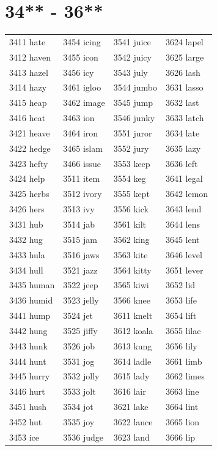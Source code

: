 \documentclass[12pt, oneside]{book}
\begin{document}
	\begin{table}[h]
		\centering
		\section*{34** - 36**}
		\begin{tabular}{l l l l}
			3411 hate & 3454 icing & 3541 juice & 3624 lapel\\
			3412 haven & 3455 icon & 3542 juicy & 3625 large\\
			3413 hazel & 3456 icy & 3543 july & 3626 lash\\
			3414 hazy & 3461 igloo & 3544 jumbo & 3631 lasso\\
			3415 heap & 3462 image & 3545 jump & 3632 last\\
			3416 heat & 3463 ion & 3546 junky & 3633 latch\\
			3421 heave & 3464 iron & 3551 juror & 3634 late\\
			3422 hedge & 3465 islam & 3552 jury & 3635 lazy\\
			3423 hefty & 3466 issue & 3553 keep & 3636 left\\
			3424 help & 3511 item & 3554 keg & 3641 legal\\
			3425 herbs & 3512 ivory & 3555 kept & 3642 lemon\\
			3426 hers & 3513 ivy & 3556 kick & 3643 lend\\
			3431 hub & 3514 jab & 3561 kilt & 3644 lens\\
			3432 hug & 3515 jam & 3562 king & 3645 lent\\
			3433 hula & 3516 jaws & 3563 kite & 3646 level\\
			3434 hull & 3521 jazz & 3564 kitty & 3651 lever\\
			3435 human & 3522 jeep & 3565 kiwi & 3652 lid\\
			3436 humid & 3523 jelly & 3566 knee & 3653 life\\
			3441 hump & 3524 jet & 3611 knelt & 3654 lift\\
			3442 hung & 3525 jiffy & 3612 koala & 3655 lilac\\
			3443 hunk & 3526 job & 3613 kung & 3656 lily\\
			3444 hunt & 3531 jog & 3614 ladle & 3661 limb\\
			3445 hurry & 3532 jolly & 3615 lady & 3662 limes\\
			3446 hurt & 3533 jolt & 3616 lair & 3663 line\\
			3451 hush & 3534 jot & 3621 lake & 3664 lint\\
			3452 hut & 3535 joy & 3622 lance & 3665 lion\\
			3453 ice & 3536 judge & 3623 land & 3666 lip\\
			
		\end{tabular}
	\end{table}
	
\end{document}
